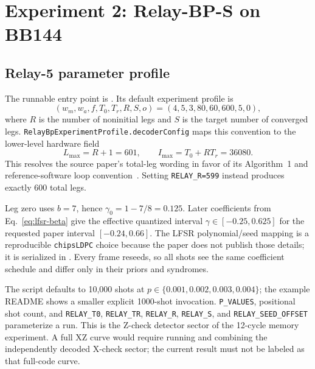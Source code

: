 \documentclass[10pt,conference]{IEEEtran}
\begin{document}
\section{Experiment 2: Relay-BP-S on BB144}
\subsection{Relay-5 parameter profile}
The runnable entry point is
.  Its default experiment
profile is
\begin{equation}
 (w_m,w_a,f,T_0,T_r,R,S,o)=(4,5,3,80,60,600,5,0),
 \label{eq:relay-experiment-profile}
\end{equation}
where $R$ is the number of noninitial legs and $S$ is the
target number of converged legs.  \texttt{RelayBpExperimentProfile.decoderConfig}
maps this convention to the lower-level hardware field
\begin{equation}
 L_{\max}=R+1=601,
 \qquad I_{\max}=T_0+RT_r=36080.
 \label{eq:relay-profile-capacity}
\end{equation}
This resolves the source paper's total-leg wording in favor of its Algorithm~1
and reference-software loop convention~\cite{maurer2025}.  Setting
\texttt{RELAY\_R=599} instead produces exactly 600 total legs.

Leg zero uses $b=7$, hence $\gamma_0=1-7/8=0.125$.  Later coefficients from
Eq.~\eqref{eq:lfsr-beta} give the effective quantized interval
$\gamma\in[-0.25,0.625]$ for the requested paper interval
$[-0.24,0.66]$.  The LFSR polynomial/seed mapping is a reproducible
\texttt{chipsLDPC} choice because the paper does not publish those details; it
is serialized in .  Every frame reseeds, so all
shots see the same coefficient schedule and differ only in their priors and
syndromes.

The script defaults to 10,000 shots at
$p\in\{0.001,0.002,0.003,0.004\}$; the example README shows a smaller explicit
1000-shot invocation.  \texttt{P\_VALUES}, positional shot count, and
\texttt{RELAY\_T0}, \texttt{RELAY\_TR}, \texttt{RELAY\_R},
\texttt{RELAY\_S}, and \texttt{RELAY\_SEED\_OFFSET} parameterize a run.  This
is the Z-check detector sector of the 12-cycle memory experiment.  A full XZ
curve would require running and combining the independently decoded X-check
sector; the current result must not be labeled as that full-code curve.
\end{document}
